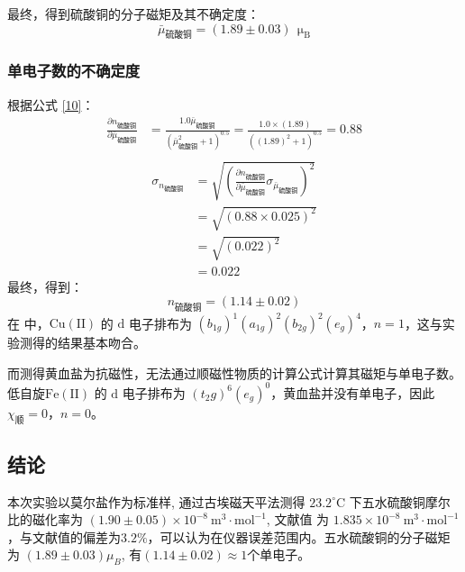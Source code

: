\documentclass[cn,hazy,pku,12pt,normal,math=newtx,cite=super]{elegantnote}
\begin{document}
最终，得到硫酸铜的分子磁矩及其不确定度：
\begin{equation*}
\bar{\mu}_{\text{硫酸铜}}=\left (1.89 \pm 0.03 \right )\ \mathrm{~\mu_{B}}
\end{equation*}

\subsubsection{单电子数的不确定度}

根据公式 \eqref{10}：
\begin{equation*}
\begin{aligned}
\frac{\partial n_{\text{硫酸铜}} }{\partial \bar{\mu}_{\text{硫酸铜}} }&=\frac{1.0 \bar{\mu}_{\text{硫酸铜}}}{\left(\bar{\mu}_{\text{硫酸铜}}^{2} + 1\right)^{0.5}}=\frac{1.0 \times \left(1.89\right)}{\left(\left(1.89\right)^{2} + 1\right)^{0.5}}=0.88\\
\end{aligned}
\end{equation*}
\begin{equation*}
\begin{aligned}
\sigma_{n_{\text{硫酸铜}}}&=\sqrt{\left(\frac{\partial n_{\text{硫酸铜}} }{\partial \bar{\mu}_{\text{硫酸铜}} } \sigma_{\bar{\mu}_{\text{硫酸铜}}}\right)^2}\\
&=\sqrt{\left(0.88 \times 0.025\right)^2}\\
&=\sqrt{\left(0.022\right)^2}\\
&=0.022
\end{aligned}
\end{equation*}
最终，得到：
\begin{equation}
n_{\text{硫酸铜}}=\left (1.14 \pm 0.02 \right )
\end{equation}
在  中，$\mathrm{Cu}(\mathrm{II})$ 的 $\mathrm{d}$ 电子排布为 $\left(b_{1 g}\right)^1\left(a_{1 g}\right)^2\left(b_{2 g}\right)^2\left(e_g\right)^4$，$n=1$，这与实验测得的结果基本吻合。

而测得黄血盐为抗磁性，无法通过顺磁性物质的计算公式计算其磁矩与单电子数。低自旋$\mathrm{Fe}(\mathrm{II})$ 的 $\mathrm{d}$ 电子排布为 $\left(t_2g\right)^6\left(e_g\right)^0$，黄血盐并没有单电子，因此 $\chi_{\text{顺}}=0$，$n=0$。

\subsection{结论}

本次实验以莫尔盐作为标准样, 通过古埃磁天平法测得 $23.2^{\circ} \mathrm{C}$ 下五水硫酸铜摩尔比的磁化率为 $(1.90\pm 0.05) \times 10^{-8} \mathrm{~m}^3 \cdot \mathrm{mol}^{-1}$, 文献值\cite{haynes2016crc} 为 $1.835 \times 10^{-8} \mathrm{~m}^3 \cdot \mathrm{mol}^{-1}$，与文献值的偏差为$3.2\%$，可以认为在仪器误差范围内。五水硫酸铜的分子磁矩为 $(1.89\pm 0.03) \mu_B$, 有$(1.14\pm 0.02) \approx 1$个单电子。
\end{document}
